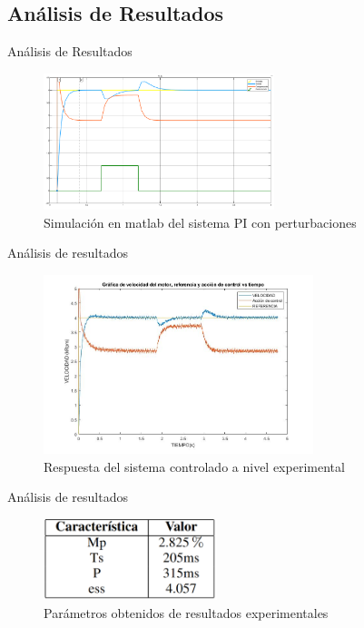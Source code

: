 \documentclass[mathserif,spanish]{beamer}
\begin{document}
    \subsection{Análisis de Resultados}
         \begin{frame}{Análisis de Resultados}
         \begin{figure}[!h]
\centering
\includegraphics[width=0.6\textwidth]{simu_matl.png}
\caption{Simulación en matlab del sistema PI con perturbaciones}
\label{fig:simu_mat}
\end{figure}

        \end{frame}
        \begin{frame}{Análisis de resultados}

                 \begin{figure}[!h]
\centering
\includegraphics[width=0.7\textwidth]{RESULTADOS_MOTOR_CD.jpg}
\caption{Respuesta del sistema controlado a nivel experimental}
\label{fig:tabla_re}
\end{figure}
            
        \end{frame}

        \begin{frame}{Análisis de resultados}

                 \begin{figure}[!h]
\centering
\includegraphics[width=0.45\textwidth]{tabla_result.png}
\caption{Parámetros obtenidos de resultados experimentales}
\label{fig:tabla_re}
\end{figure}
            
        \end{frame}
\end{document}
